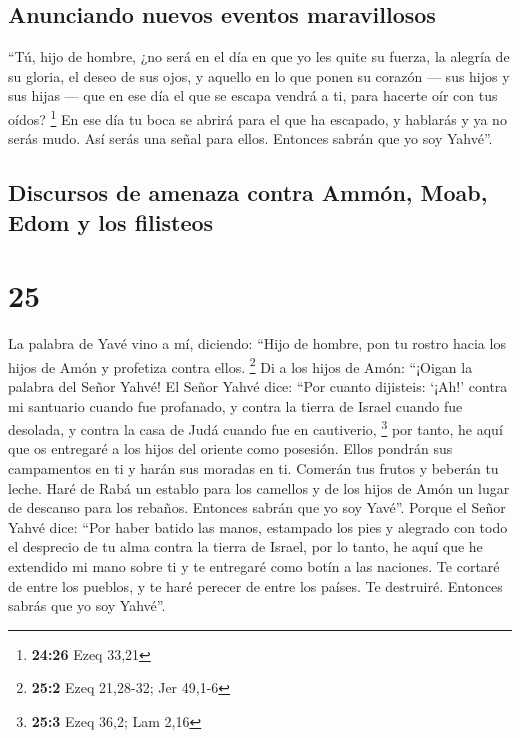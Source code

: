 \hypertarget{anunciando-nuevos-eventos-maravillosos}{%
\subsection{Anunciando nuevos eventos
maravillosos}\label{anunciando-nuevos-eventos-maravillosos}}

 ``Tú, hijo de hombre, ¿no será en el día en que yo les
quite su fuerza, la alegría de su gloria, el deseo de sus ojos, y
aquello en lo que ponen su corazón --- sus hijos y sus hijas ---
 que en ese día el que se escapa vendrá a ti, para
hacerte oír con tus oídos? \footnote{\textbf{24:26} Ezeq 33,21}
 En ese día tu boca se abrirá para el que ha escapado, y
hablarás y ya no serás mudo. Así serás una señal para ellos. Entonces
sabrán que yo soy Yahvé''.

\hypertarget{discursos-de-amenaza-contra-ammuxf3n-moab-edom-y-los-filisteos}{%
\subsection{Discursos de amenaza contra Ammón, Moab, Edom y los
filisteos}\label{discursos-de-amenaza-contra-ammuxf3n-moab-edom-y-los-filisteos}}

\hypertarget{section-24}{%
\section{25}\label{section-24}}

 La palabra de Yavé vino a mí, diciendo: 
``Hijo de hombre, pon tu rostro hacia los hijos de Amón y profetiza
contra ellos. \footnote{\textbf{25:2} Ezeq 21,28-32; Jer 49,1-6}
 Di a los hijos de Amón: ``¡Oigan la palabra del Señor
Yahvé! El Señor Yahvé dice: ``Por cuanto dijisteis: `¡Ah!' contra mi
santuario cuando fue profanado, y contra la tierra de Israel cuando fue
desolada, y contra la casa de Judá cuando fue en cautiverio, \footnote{\textbf{25:3}
  Ezeq 36,2; Lam 2,16}  por tanto, he aquí que os
entregaré a los hijos del oriente como posesión. Ellos pondrán sus
campamentos en ti y harán sus moradas en ti. Comerán tus frutos y
beberán tu leche.  Haré de Rabá un establo para los
camellos y de los hijos de Amón un lugar de descanso para los rebaños.
Entonces sabrán que yo soy Yavé''.  Porque el Señor Yahvé
dice: ``Por haber batido las manos, estampado los pies y alegrado con
todo el desprecio de tu alma contra la tierra de Israel, 
por lo tanto, he aquí que he extendido mi mano sobre ti y te entregaré
como botín a las naciones. Te cortaré de entre los pueblos, y te haré
perecer de entre los países. Te destruiré. Entonces sabrás que yo soy
Yahvé''.

